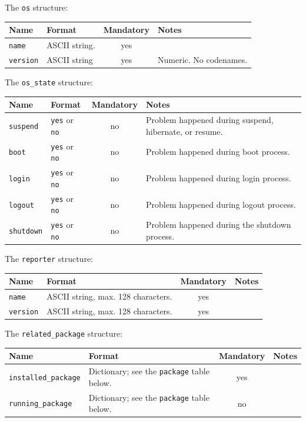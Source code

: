 \documentclass{article}
\begin{document}
The \texttt{os} structure:

\begin{center}
\begin{tabular}{l|p{5cm}|c|p{5cm}}
\hline
Name & Format & Mandatory & Notes \\ \hline
\texttt{name} & ASCII string. & yes &  \\
\texttt{version} & ASCII string & yes & Numeric. No codenames. \\
\hline
\end{tabular}
\end{center}

The \texttt{os\_state} structure:

\begin{center}
\begin{tabular}{l|p{5cm}|c|p{5cm}}
\hline
Name & Format & Mandatory & Notes \\ \hline
\texttt{suspend} & \texttt{yes} or \texttt{no} & no & Problem happened during suspend, hibernate, or resume. \\
\texttt{boot} & \texttt{yes} or \texttt{no} & no & Problem happened during boot process. \\
\texttt{login} & \texttt{yes} or \texttt{no} & no & Problem happened during login process. \\
\texttt{logout} & \texttt{yes} or \texttt{no} & no & Problem happened during logout process. \\
\texttt{shutdown} & \texttt{yes} or \texttt{no} & no & Problem happened during the shutdown process. \\
\hline
\end{tabular}
\end{center}

The \texttt{reporter} structure:

\begin{center}
\begin{tabular}{l|p{5cm}|c|p{5cm}}
\hline
Name & Format & Mandatory & Notes \\ \hline
\texttt{name} & ASCII string, max. 128 characters. & yes & \\
\texttt{version} & ASCII string, max. 128 characters. & yes & \\
\hline
\end{tabular}
\end{center}

The \texttt{related\_package} structure:
\begin{center}
\begin{tabular}{l|p{5cm}|c|p{5cm}}
\hline
Name & Format & Mandatory & Notes \\ \hline
\texttt{installed\_package} & Dictionary; see the \texttt{package} table below. & yes & \\
\texttt{running\_package} & Dictionary; see the \texttt{package} table below. & no & \\
\hline
\end{tabular}
\end{center}
\end{document}
